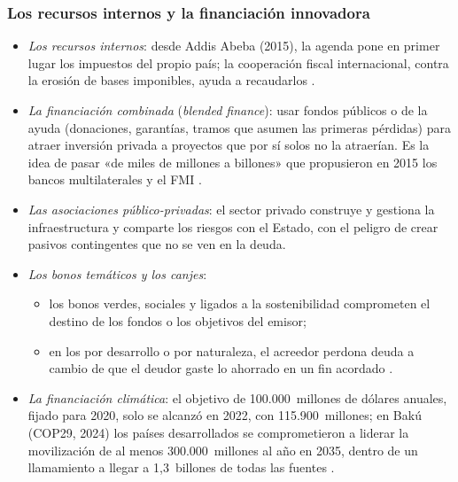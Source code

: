 \documentclass[11pt]{article}
\begin{document}
\subsubsection{Los recursos internos y la financiación innovadora}\label{sec:innovadora}

\begin{itemize}
\item \emph{Los recursos internos}: desde Addis Abeba (2015), la agenda pone en primer lugar los impuestos del propio país; la cooperación fiscal internacional, contra la erosión de bases imponibles, ayuda a recaudarlos .
\item \emph{La financiación combinada} (\emph{blended finance}): usar fondos públicos o de la ayuda (donaciones, garantías, tramos que asumen las primeras pérdidas) para atraer inversión privada a proyectos que por sí solos no la atraerían. Es la idea de pasar «de miles de millones a billones» que propusieron en 2015 los bancos multilaterales y el FMI .
\item \emph{Las asociaciones público-privadas}: el sector privado construye y gestiona la infraestructura y comparte los riesgos con el Estado, con el peligro de crear pasivos contingentes que no se ven en la deuda.
\item \emph{Los bonos temáticos y los canjes}:
  \begin{itemize}
  \item los bonos verdes, sociales y ligados a la sostenibilidad comprometen el destino de los fondos o los objetivos del emisor;
  \item en los  por desarrollo o por naturaleza, el acreedor perdona deuda a cambio de que el deudor gaste lo ahorrado en un fin acordado .
  \end{itemize}
\item \emph{La financiación climática}: el objetivo de 100.000~millones de dólares anuales, fijado para 2020, solo se alcanzó en 2022, con 115.900~millones\nocite{OCDE2024Financiacion}; en Bakú (COP29, 2024) los países desarrollados se comprometieron a liderar la movilización de al menos 300.000~millones al año en 2035, dentro de un llamamiento a llegar a 1,3~billones de todas las fuentes\nocite{CMNUCC2024NCQG} .
\end{itemize}
\end{document}
